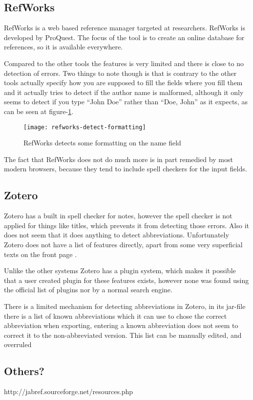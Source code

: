 
\subsection{RefWorks}
RefWorks is a web based reference manager targeted at researchers.
RefWorks is developed by ProQuest.  The focus of the tool is to create
an online database for references, so it is available everywhere.

Compared to the other tools the features is very limited and there is
close to no detection of errors.  Two things to note though is that is
contrary to the other tools actually specify how you are supposed to
fill the fields where you fill them and it actually tries to detect if
the author name is malformed, although it only seems to detect if you
type ``John Doe'' rather than ``Doe, John'' as it expects, as can be
seen at figure-\ref{fig:refworks-detect-formatting}.

\begin{figure}[h]
    \centering
    \texttt{[image: refworks-detect-formatting]}
    \caption{RefWorks detects some formatting on the name field}
    \label{fig:refworks-detect-formatting}
\end{figure}

The fact that RefWorks does not do much more is in part remedied by
most modern browsers, because they tend to include spell checkers for
the input fields.

\subsection{Zotero}
Zotero has a built in spell checker for notes, however the spell
checker is not applied for things like titles, which prevents it from
detecting those errors.  Also it does not seem that it does anything
to detect abbreviations.  Unfortunately Zotero does not have a list of
features directly, apart from some very superficial texts on the front
page \cite{zotero_features}.

Unlike the other systems Zotero has a plugin system, which makes it
possible that a user created plugin for these features exists, however
none was found using the official list of plugins
\cite{zotero_plugins} nor by a normal search engine.

There is a limited mechanism for detecting abbreviations in Zotero, in
its jar-file there is a list of known abbreviations which it can use
to chose the correct abbreviation when exporting, entering a known
abbreviation does not seem to correct it to the non-abbreviated
version.  This list can be manually edited, and overruled
\cite{zotero_abbreviations}

\subsection{Others?}

http://jabref.sourceforge.net/resources.php

